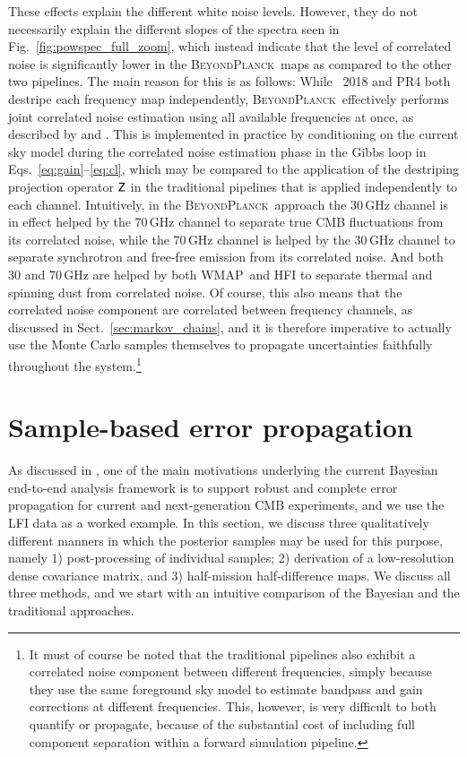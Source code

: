 \documentclass[twocolumn]{aa}
\def\WMAP{WMAP}
\newcommand{\Z}[0]{\tens{Z}}
\newcommand{\BP}{\textsc{BeyondPlanck}}
\begin{document}
These effects explain the different white noise levels. However, they
do not necessarily explain the different slopes of the spectra seen in Fig.~\ref{fig:powspec_full_zoom},
which instead indicate that the level of correlated noise is
significantly lower in the \BP\ maps as compared to the other two
pipelines. The main reason for this is as follows: While \Planck\ 2018
and PR4 both destripe each frequency map independently,
\BP\ effectively performs joint correlated noise estimation using all
available frequencies at once, as described by \citet{bp01} and \citet{bp06}. This
is implemented in practice by conditioning on the current sky model
during the correlated noise estimation phase in the Gibbs loop in
Eqs.~\eqref{eq:gain}--\eqref{eq:cl}, which may be compared to the
application of the destriping projection operator $\Z$ in the
traditional pipelines that is applied independently to each
channel. Intuitively, in the \BP\ approach the 30\,GHz channel is in
effect helped by the 70\,GHz channel to separate true CMB fluctuations
from its correlated noise, while the 70\,GHz channel is helped by the
30\,GHz channel to separate synchrotron and free-free emission from
its correlated noise. And both 30 and 70\,GHz are helped by both
\WMAP\ and HFI to separate thermal and spinning dust from correlated
noise. Of course, this also means that the correlated noise component
are correlated between frequency channels, as discussed in
Sect.~\ref{sec:markov_chains}, and it is therefore imperative to
actually use the Monte Carlo samples themselves to propagate
uncertainties faithfully throughout the system.\footnote{It must of
  course be noted that the traditional pipelines also exhibit a
  correlated noise component between different frequencies, simply
  because they use the same foreground sky model to estimate bandpass
  and gain corrections at different frequencies. This, however, is
  very difficult to both quantify or propagate, because of the
  substantial cost of including full component separation within a
  forward simulation pipeline.}




\section{Sample-based error propagation}
\label{sec:error_propagation}

As discussed in \citet{bp01}, one of the main motivations underlying
the current Bayesian end-to-end analysis framework is to support
robust and complete error propagation for current and next-generation
CMB experiments, and we use the LFI data as a worked example. In this
section, we discuss three qualitatively different manners in which the
posterior samples may be used for this purpose, namely 1)
post-processing of individual samples; 2) derivation of a
low-resolution dense covariance matrix, and 3) half-mission
half-difference maps. We discuss all three methods, and we start with
an intuitive comparison of the Bayesian and the traditional
approaches.
\end{document}
